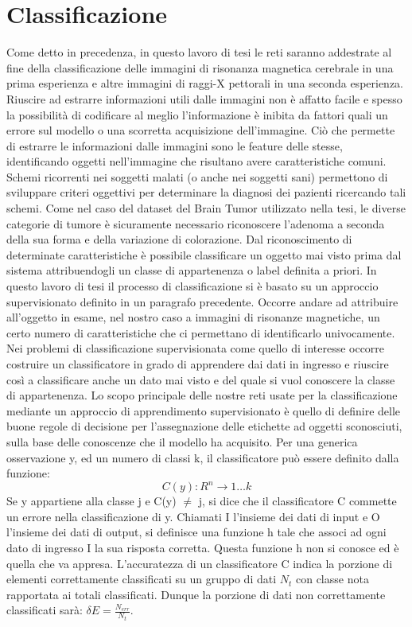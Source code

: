 \section{Classificazione}
Come detto in precedenza, in questo lavoro di tesi le reti saranno addestrate al fine 
della classificazione delle immagini di risonanza magnetica cerebrale in una prima 
esperienza e altre immagini di raggi-X pettorali in una seconda esperienza. 
Riuscire ad estrarre informazioni utili dalle immagini non è affatto facile e spesso 
la possibilità di codificare al meglio l’informazione è inibita da fattori quali un errore 
sul modello o una scorretta acquisizione dell’immagine. Ciò che permette di estrarre le 
informazioni dalle immagini sono le feature delle stesse, identificando oggetti nell’immagine
 che risultano avere caratteristiche comuni. Schemi ricorrenti nei soggetti malati (o anche
  nei soggetti sani) permettono di sviluppare criteri oggettivi per determinare la diagnosi 
  dei pazienti ricercando tali schemi. Come nel caso del dataset del Brain Tumor utilizzato 
  nella tesi, le diverse categorie di tumore è sicuramente necessario riconoscere l’adenoma 
  a seconda della sua forma e della variazione di colorazione. Dal riconoscimento di determinate
   caratteristiche è possibile classificare un oggetto mai visto prima dal sistema attribuendogli
    un classe di appartenenza o label definita a priori.
In questo lavoro di tesi il processo di classificazione si è basato su un approccio supervisionato
 definito in un paragrafo precedente. Occorre andare ad attribuire all’oggetto in esame, 
 nel nostro caso a immagini di risonanze magnetiche, un certo numero di caratteristiche 
 che ci permettano di identificarlo univocamente. \\
 Nei problemi di classificazione 
supervisionata come quello di interesse occorre costruire un classificatore in grado di 
apprendere dai dati in ingresso e riuscire così a classificare anche un dato mai visto e
 del quale si vuol conoscere la classe di appartenenza. 
Lo scopo principale delle nostre reti usate per la classificazione mediante un approccio 
di apprendimento supervisionato è quello di definire delle buone regole di decisione per
 l’assegnazione delle etichette ad oggetti sconosciuti, sulla base delle conoscenze che 
 il modello ha acquisito. Per una generica osservazione y, ed un numero di classi k, il 
 classificatore può essere definito dalla funzione:
\[C(y) : R^{n} \rightarrow 1 … k\] 
Se y appartiene alla classe j e C(y) \(\neq\) j, si dice che il classificatore C commette un errore
nella classificazione di y. Chiamati I l’insieme dei dati di input e O l’insieme dei dati
 di output, si definisce una funzione h tale che associ ad ogni dato di ingresso I la sua 
 risposta corretta. Questa funzione h non si conosce ed è quella che va appresa.
  L’accuratezza di un classificatore C indica la porzione di elementi correttamente 
  classificati su un gruppo di dati \(N_t\) con classe nota rapportata ai totali classificati. 
  Dunque la porzione di dati non correttamente classificati sarà: \( \delta E = \frac{N_{err}}{N_t}\).

